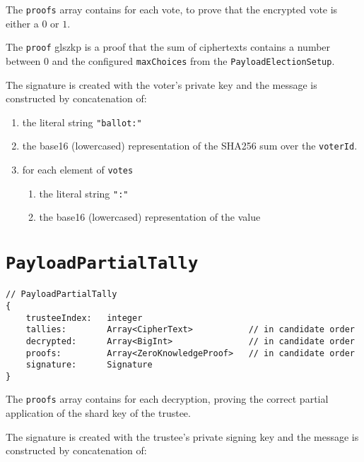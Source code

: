 The \texttt{proofs} array contains  for each vote, to prove that the encrypted vote is either a $0$ or $1$.

The \texttt{proof} gls{zkp} is a proof that the sum of ciphertexts contains a number between $0$ and the configured \texttt{maxChoices} from the \texttt{PayloadElectionSetup}.

The signature is created with the voter's private key and the message is constructed by concatenation of:

\begin{enumerate}
    \item the literal string \lstinline[style=ES6]{"ballot:"}
    \item the base16 (lowercased) representation of the SHA256 sum over the \texttt{voterId}.
    \item for each element of \texttt{votes}
          \begin{enumerate}
              \item the literal string \lstinline[style=ES6]{":"}
              \item the base16 (lowercased) representation of the value
          \end{enumerate}
\end{enumerate}

\section*{\texttt{PayloadPartialTally}}
\label{dt:payload:tally}
\begin{lstlisting}[style=ES6]
// PayloadPartialTally
{
    trusteeIndex:   integer
    tallies:        Array<CipherText>           // in candidate order
    decrypted:      Array<BigInt>               // in candidate order
    proofs:         Array<ZeroKnowledgeProof>   // in candidate order
    signature:      Signature
}
\end{lstlisting}

The \texttt{proofs} array contains  for each decryption, proving the correct partial application of the shard key of the trustee.

The signature is created with the trustee's private signing key and the message is constructed by concatenation of:

